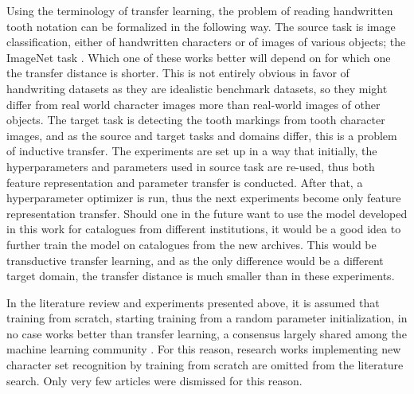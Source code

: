 \documentclass{article}
\begin{document}
Using the terminology of transfer learning, the problem of reading handwritten 
tooth notation can be formalized in the following way. The source task is image classification,
either of handwritten characters or of images of various objects; the ImageNet task \cite{imagenet}.
Which one of these works better will depend on for which one the transfer distance is shorter.
This is not entirely obvious in favor of handwriting datasets as they are idealistic benchmark datasets, 
so they might differ from real world character images more than real-world images of other objects. The target task is detecting the tooth markings from tooth character images, and as the source and target 
tasks and domains differ, this is a problem of inductive transfer. The experiments are 
set up in a way that initially, the hyperparameters and 
parameters used in source task are re-used, thus both feature representation and parameter 
transfer is conducted. After that, a hyperparameter optimizer is run, thus the next experiments 
become only feature representation transfer. Should one in the future want to use the model 
developed in this work for catalogues from different institutions, it would be a good idea to 
further train the model on catalogues from the new archives. This would be transductive transfer learning, 
and as the only difference would be a different target domain, the transfer distance is much smaller 
than in these experiments.

In the literature review and experiments presented above, it is assumed that training 
from scratch, starting training from a random parameter initialization, in no case works 
better than transfer learning, a consensus largely shared among the machine learning community \cite{cs231n_transfer_learning}.
For this reason, research works implementing new character set recognition by training from scratch 
are omitted from the literature search. Only very few articles were dismissed for this reason.
\end{document}
